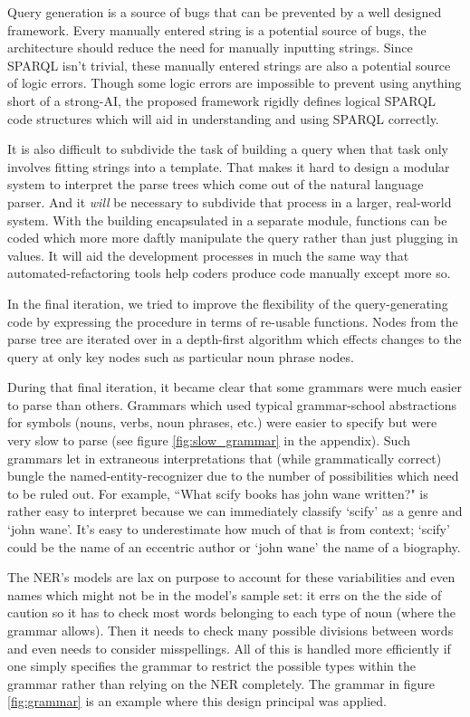 \documentclass[11pt]{article}
\begin{document}
Query generation is a source of bugs that can be prevented by a well
designed framework. Every manually entered string is a potential source of bugs, the
architecture should reduce the need for manually inputting strings. Since SPARQL isn't
trivial, these manually entered strings are also a potential source
of logic errors. Though some logic errors are impossible to prevent using anything short of
a strong-AI, the proposed framework rigidly defines logical SPARQL code structures which
will aid in understanding and using SPARQL correctly. 

It is also difficult to subdivide the task of building a query when that task only
involves fitting strings into a template. That makes it hard to design a modular system to
interpret the parse trees which come out of the natural language parser. And it {\em will}
be necessary to subdivide that process in a larger, real-world system. With the building
encapsulated in a separate module, functions can be coded which more more daftly manipulate
the query rather than just plugging in values. It will aid the development processes in
much the same way that automated-refactoring tools help coders produce code manually except
more so.

In the final iteration, we tried to improve the flexibility of the 
query-generating code by expressing the procedure in terms of re-usable
functions. Nodes from the parse tree are iterated over in a depth-first
algorithm which effects changes to the query at only key nodes such
as particular noun phrase nodes.

During that final iteration, it became clear that some grammars were much
easier to parse than others. Grammars which used typical grammar-school abstractions
for symbols (nouns, verbs, noun phrases, etc.) were easier to specify but were very
slow to parse (see figure \ref{fig:slow_grammar} in the appendix). Such grammars let in 
extraneous interpretations that (while grammatically
correct) bungle the named-entity-recognizer due to the number of possibilities which
need to be ruled out. For example, ``What scify books has john wane written?" is rather
easy to interpret because we can immediately classify `scify' as a genre and `john wane'.
It's easy to underestimate how much of that is from context; `scify' could be the
name of an eccentric author or `john wane' the name of a biography.

The NER's models are lax on purpose to account for these variabilities and
even names which might not be in the model's sample set: it errs
on the the side of caution so it has to check most words belonging to each type
of noun (where the grammar allows). Then it needs to check many possible divisions
between words and even needs to consider misspellings. All of this is handled more 
efficiently if one simply specifies the grammar to restrict the possible types 
within the grammar rather than relying on the NER completely. The grammar
in figure \ref{fig:grammar} is an example where this design principal was applied.
\end{document}
